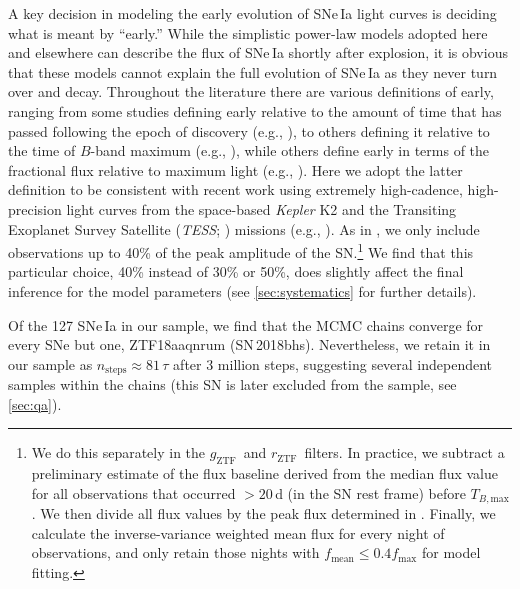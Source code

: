 \documentclass[twocolumn]{./aastex63}
\newcommand{\rztf}{$r_\mathrm{ZTF}$}
\newcommand{\gztf}{$g_\mathrm{ZTF}$}
\newcommand{\tbmax}{$T_{B,\mathrm{max}}$}
\begin{document}
A key decision in modeling the early evolution of SNe\,Ia light curves is
deciding what is meant by ``early.'' While the simplistic power-law models
adopted here and elsewhere can describe the flux of SNe\,Ia shortly after
explosion, it is obvious that these models cannot explain the full evolution
of SNe\,Ia as they never turn over and decay. Throughout the literature there
are various definitions of early, ranging from some studies defining early
relative to the amount of time that has passed following the epoch of
discovery (e.g., \citealt{Nugent11,Zheng13,Miller18}), to others defining it
relative to the time of $B$-band maximum (e.g.,
\citealt{Riess99a,Aldering00,Conley06,Dimitriadis19}), while others define
early in terms of the fractional flux relative to maximum light (e.g.,
\citealt{Olling15,Firth15,Fausnaugh19}). Here we adopt the latter definition
to be consistent with recent work using extremely high-cadence, high-precision
light curves from the space-based \textit{Kepler} K2 \citep{Howell14} and the
Transiting Exoplanet Survey Satellite (\textit{TESS}; \citealt{Ricker15})
missions (e.g., \citealt{Olling15,Fausnaugh19}). As in \citet{Olling15}, we
only include observations up to 40\% of the peak amplitude of the
SN.\footnote{We do this separately in the \gztf\ and \rztf\ filters. In
practice, we subtract a preliminary estimate of the flux baseline derived from
the median flux value for all observations that occurred $>20$\,d (in the SN
rest frame) before \tbmax. We then divide all flux values by the peak flux
determined in \citet{Yao19}. Finally, we calculate the inverse-variance
weighted mean flux for every night of observations, and only retain those
nights with $f_\mathrm{mean} \le 0.4 f_\mathrm{max}$ for model fitting.} We
find that this particular choice, 40\% instead of 30\% or 50\%, does slightly
affect the final inference for the model parameters (see \ref{sec:systematics}
for further details).

Of the 127 SNe\,Ia in our sample, we find that the MCMC chains converge for
every SNe but one, ZTF18aaqnrum (SN\,2018bhs). Nevertheless, we retain it in
our sample as $n_\mathrm{steps} \approx 81 \,\tau$ after 3 million steps,
suggesting several independent samples within the chains (this SN is later
excluded from the sample, see \ref{sec:qa}).
\end{document}
